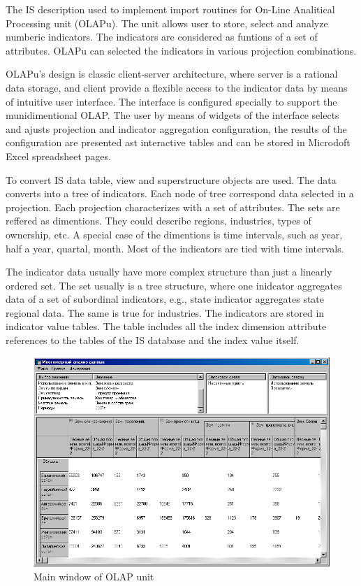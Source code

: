 \documentclass[conference]{IEEEtran}
\begin{document}
The IS description used to implement import routines for On-Line Analitical Processing unit (OLAPu).  The unit allows user to store, select and analyze numberic indicators.  The indicators are considered as funtions of a set of attributes.  OLAPu can
selected the indicators in various projection combinations.

OLAPu's design is classic client-server architecture, where server is a rational data storage, and client provide a flexible access to the indicator data by means of intuitive user interface.  The interface is configured specially to support the munidimentional OLAP.  The user by means of widgets of the interface selects and ajusts projection and indicator aggregation configuration, the results of the configuration are presented ast interactive tables and can be stored in Microdoft Excel spreadsheet pages.

To convert IS data {table}, {view} and {superstructure} objects are used.  The data converts into a tree of indicators.  Each node of tree correspond data selected in a projection.  Each projection characterizes with a set of attributes.  The sets are reffered as dimentions.  They could describe regions, industries, types of ownership, etc.  A special case of the dimentions is time intervals, such as year, half a year, quartal, month.  Most of the indicators are tied with time intervals.

The indicator data usually have more complex structure than just a linearly ordered set.  The set usually is a tree structure, where one inidcator aggregates data of a set of subordinal indicators, e.g., state indicator aggregates state regional data.  The same is true for industries.  The indicators are stored in indicator value tables.  The table includes all the index dimension attribute references to the tables of the IS database and the index value itself.

\begin{figure}[bt]
  \centering
  \includegraphics[width=\linewidth]{MDA-olap.png}
  \caption{Main window of OLAP unit}
  \label{fig:olapu}
\end{figure}
\end{document}
